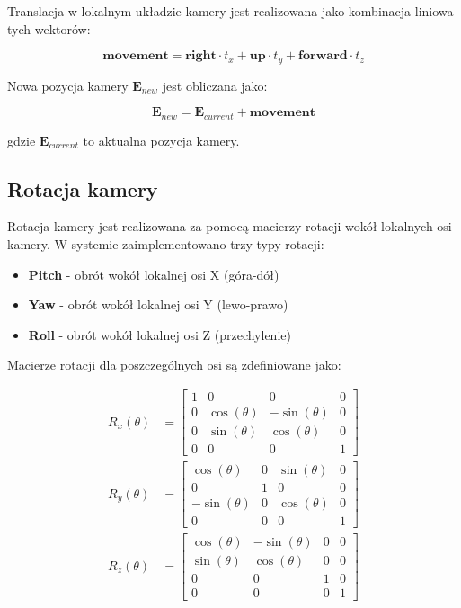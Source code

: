 \documentclass[a4paper,12pt]{article}
\begin{document}
Translacja w lokalnym układzie kamery jest realizowana jako kombinacja liniowa tych wektorów:

\[
\mathbf{movement} = \mathbf{right} \cdot t_x + \mathbf{up} \cdot t_y + \mathbf{forward} \cdot t_z
\]

Nowa pozycja kamery \( \mathbf{E}_{new} \) jest obliczana jako:

\[
\mathbf{E}_{new} = \mathbf{E}_{current} + \mathbf{movement}
\]

gdzie \( \mathbf{E}_{current} \) to aktualna pozycja kamery.

\subsection{Rotacja kamery}

Rotacja kamery jest realizowana za pomocą macierzy rotacji wokół lokalnych osi kamery. W systemie zaimplementowano trzy typy rotacji:

\begin{itemize}
    \item \textbf{Pitch} - obrót wokół lokalnej osi X (góra-dół)
    \item \textbf{Yaw} - obrót wokół lokalnej osi Y (lewo-prawo)
    \item \textbf{Roll} - obrót wokół lokalnej osi Z (przechylenie)
\end{itemize}

Macierze rotacji dla poszczególnych osi są zdefiniowane jako:

\begin{align*}
R_x(\theta) &= \begin{bmatrix}
1 & 0 & 0 & 0 \\
0 & \cos(\theta) & -\sin(\theta) & 0 \\
0 & \sin(\theta) & \cos(\theta) & 0 \\
0 & 0 & 0 & 1
\end{bmatrix} \\
R_y(\theta) &= \begin{bmatrix}
\cos(\theta) & 0 & \sin(\theta) & 0 \\
0 & 1 & 0 & 0 \\
-\sin(\theta) & 0 & \cos(\theta) & 0 \\
0 & 0 & 0 & 1
\end{bmatrix} \\
R_z(\theta) &= \begin{bmatrix}
\cos(\theta) & -\sin(\theta) & 0 & 0 \\
\sin(\theta) & \cos(\theta) & 0 & 0 \\
0 & 0 & 1 & 0 \\
0 & 0 & 0 & 1
\end{bmatrix}
\end{align*}
\end{document}

